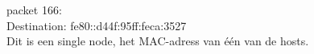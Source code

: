 packet 166:\\

Destination: fe80::d44f:95ff:feca:3527\\
Dit is een single node, het MAC-adress van één van de hosts. 